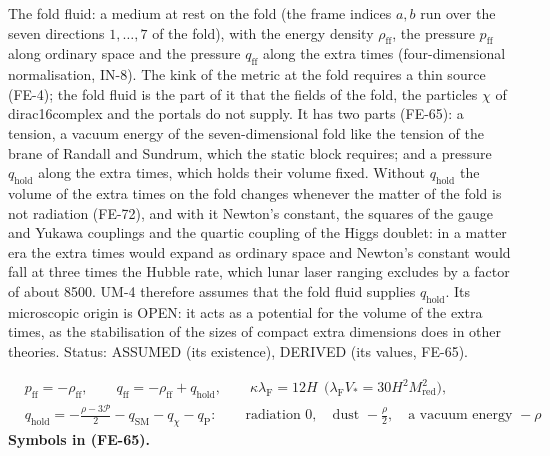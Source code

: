\documentclass[
  10pt,
]{article}
\begin{document}
The fold fluid: a medium at rest on the fold (the frame indices \(a, b\)
run over the seven directions \(1, \dots, 7\) of the fold), with the
energy density \(\rho_{\mathrm{ff}}\), the pressure \(p_{\mathrm{ff}}\)
along ordinary space and the pressure \(q_{\mathrm{ff}}\) along the
extra times (four-dimensional normalisation, IN-8). The kink of the
metric at the fold requires a thin source (FE-4); the fold fluid is the
part of it that the fields of the fold, the particles \(\chi\) of
dirac16complex and the portals do not supply. It has two parts (FE-65):
a tension, a vacuum energy of the seven-dimensional fold like the
tension of the brane of Randall and Sundrum, which the static block
requires; and a pressure \(q_{\mathrm{hold}}\) along the extra times,
which holds their volume fixed. Without \(q_{\mathrm{hold}}\) the volume
of the extra times on the fold changes whenever the matter of the fold
is not radiation (FE-72), and with it Newton's constant, the squares of
the gauge and Yukawa couplings and the quartic coupling of the Higgs
doublet: in a matter era the extra times would expand as ordinary space
and Newton's constant would fall at three times the Hubble rate, which
lunar laser ranging excludes by a factor of about 8500. UM-4 therefore
assumes that the fold fluid supplies \(q_{\mathrm{hold}}\). Its
microscopic origin is OPEN: it acts as a potential for the volume of the
extra times, as the stabilisation of the sizes of compact extra
dimensions does in other theories. Status: ASSUMED (its existence),
DERIVED (its values, FE-65).

\[
\begin{aligned}
&p_{\mathrm{ff}} = -\rho_{\mathrm{ff}},\qquad q_{\mathrm{ff}} = -\rho_{\mathrm{ff}} + q_{\mathrm{hold}},\qquad
 \kappa\lambda_{\mathrm{F}} = 12H\ \ \big(\lambda_{\mathrm{F}}V_* = 30H^2M_{\mathrm{red}}^2\big),\\
&q_{\mathrm{hold}} = -\frac{\rho - 3\mathcal{P}}{2} - q_{\mathrm{SM}} - q_\chi - q_{\mathrm{P}}:\qquad
 \text{radiation } 0,\quad \text{dust } -\frac{\rho}{2},\quad \text{a vacuum energy } -\rho
\end{aligned} \tag{FE-65}
\] \textbf{Symbols in (FE-65).}
\end{document}
